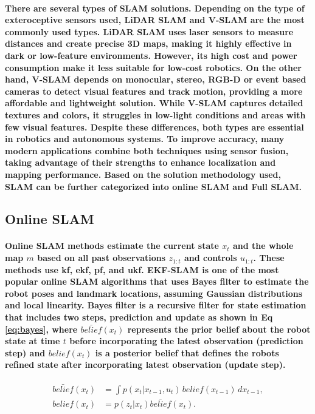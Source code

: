 \paragraph{\textnormal{There are several types of SLAM solutions. Depending on the type of exteroceptive sensors used, LiDAR SLAM and V-SLAM are the most commonly used types. LiDAR SLAM uses laser sensors to measure distances and create precise 3D maps, making it highly effective in dark or low-feature environments. However, its high cost and power consumption make it less suitable for low-cost robotics. On the other hand, V-SLAM depends on monocular, stereo, RGB-D or event based cameras to detect visual features and track motion, providing a more affordable and lightweight solution. While V-SLAM captures detailed textures and colors, it struggles in low-light conditions and areas with few visual features. Despite these differences, both types are essential in robotics and autonomous systems. To improve accuracy, many modern applications combine both techniques using sensor fusion, taking advantage of their strengths to enhance localization and mapping performance. Based on the solution methodology used, SLAM can be further categorized into online SLAM and Full SLAM.}}

\subsection{Online SLAM}
\paragraph{\textnormal{Online SLAM methods estimate the current state $ x_{t} $ and the whole map $ m $ based on all past observations $ z_{1:t} $ and controls $ u_{1:t} $. These methods use \gls{kf}, \gls{ekf}, \gls{pf}, and \gls{ukf}\cite{huang2008analysis}. EKF-SLAM is one of the most popular online SLAM algorithms that uses Bayes filter to estimate the robot poses and landmark locations, assuming Gaussian distributions and local linearity. Bayes filter is a recursive filter for state estimation that includes two steps, prediction and update as shown in Eq \eqref{eq:bayes}, where $\bar{belief}(x_{t}) $ represents the prior belief about the robot state at time $ t $ before incorporating the latest observation (prediction step) and $ belief(x_{t}) $ is a posterior belief that defines the robots refined state after incorporating latest observation (update step).}}

\begin{equation}
	\begin{split}
		\bar{belief}(x_{t}) &= \int p(x_{t} | x_{t-1}, u_{t}) \, belief(x_{t-1}) \, dx_{t-1}, \\
		belief(x_{t}) &= p(z_{t} | x_{t}) \bar{belief}(x_{t}).
	\end{split}
	\label{eq:bayes}
\end{equation}

